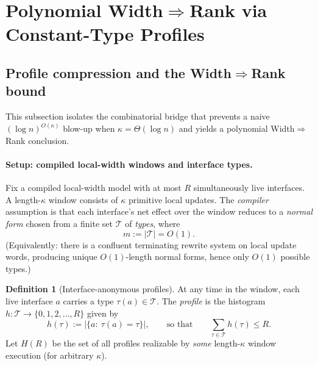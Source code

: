 \documentclass[12pt]{article}
\theoremstyle{definition}
\newtheorem{definition}{Definition}
\theoremstyle{definition}
\theoremstyle{remark}
\theoremstyle{remark}
\begin{document}
\section{Polynomial Width$\Rightarrow$Rank via Constant-Type Profiles}
\label{sec:poly-width-rank-constant}


\subsection{Profile compression and the Width$\Rightarrow$Rank bound}
\label{subsec:profile-compression-width-rank}
\label{sec:profile-compression}

This subsection isolates the combinatorial bridge that prevents a naive
$(\log n)^{O(\kappa)}$ blow-up when $\kappa=\Theta(\log n)$ and yields a polynomial
Width$\Rightarrow$Rank conclusion.

\paragraph{Setup: compiled local-width windows and interface types.}
Fix a compiled local-width model with at most $R$ simultaneously live interfaces.
A length-$\kappa$ window consists of $\kappa$ primitive local updates. The \emph{compiler}
assumption is that each interface's net effect over the window reduces to a
\emph{normal form} chosen from a finite set $\mathcal{T}$ of \emph{types}, where
\[
  m := |\mathcal{T}| = O(1).
\]
(Equivalently: there is a confluent terminating rewrite system on local update
words, producing unique $O(1)$-length normal forms, hence only $O(1)$ possible
types.)

\begin{definition}[Interface-anonymous profiles]
\label{def:profiles}
At any time in the window, each live interface $a$ carries a type
$\tau(a)\in\mathcal{T}$. The \emph{profile} is the histogram
$h:\mathcal{T}\to\{0,1,2,\dots,R\}$ given by
\[
  h(\tau) := \bigl|\{a:\ \tau(a)=\tau\}\bigr|,
  \qquad\text{so that}\qquad
  \sum_{\tau\in\mathcal{T}} h(\tau) \le R.
\]
Let $H(R)$ be the set of all profiles realizable by \emph{some} length-$\kappa$ window
execution (for arbitrary $\kappa$).
\end{definition}
\end{document}
